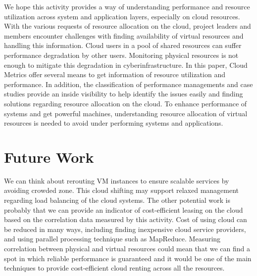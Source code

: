 \documentclass{sig-alternate}
\begin{document}
We hope this activity provides a way of understanding performance and resource utilization across system and application layers, especially on cloud resources. With the various requests of resource allocation on the cloud, project leaders and members encounter challenges with finding availability of virtual resources and handling this information. Cloud users in a pool of shared resources can suffer performance degradation by other users. Monitoring physical resources is not enough to mitigate this degradation in cyberinfrastructure. In this paper, Cloud Metrics offer several means to get information of resource utilization and performance. In addition, the classification of performance managements and case studies provide an inside visibility to help identify the issues easily and finding solutions regarding resource allocation on the cloud. To enhance performance of systems and get powerful machines, understanding resource allocation of virtual resources is needed to avoid under performing systems and applications.


\section{Future Work}

We can think about rerouting VM instances to ensure scalable services by avoiding crowded zone. This cloud shifting may support relaxed management regarding load balancing of the cloud systems. The other potential work is probably that we can provide an indicator of cost-efficient leasing on the cloud based on the correlation data measured by this activity. Cost of using cloud can be reduced in many ways, including finding inexpensive cloud service providers, and using parallel processing technique such as MapReduce. Measuring correlation between physical and virtual resources could mean that we can find a spot in which reliable performance is guaranteed and it would be one of the main techniques to provide cost-efficient cloud renting across all the resources.


\end{document}
